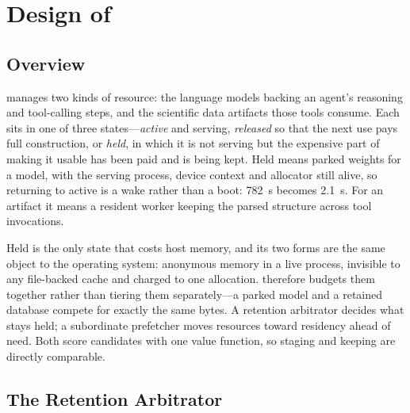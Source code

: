 
\section{Design of \sysname}

\subsection{Overview}

\sysname{} manages two kinds of resource: the language models backing an
agent's reasoning and tool-calling steps, and the scientific data artifacts
those tools consume. Each sits in one of three states---\emph{active} and
serving, \emph{released} so that the next use pays full construction, or
\emph{held}, in which it is not serving but the expensive part of making it
usable has been paid and is being kept. Held means parked weights for a model,
with the serving process, device context and allocator still alive, so
returning to active is a wake rather than a boot: 782~s becomes 2.1~s. For an
artifact it means a resident worker keeping the parsed structure across tool
invocations.

Held is the only state that costs host memory, and its two forms are the same
object to the operating system: anonymous memory in a live process, invisible
to any file-backed cache and charged to one allocation. \sysname{} therefore
budgets them together rather than tiering them separately---a parked model and
a retained database compete for exactly the same bytes. A retention arbitrator
decides what stays held; a subordinate prefetcher moves resources toward
residency ahead of need. Both score candidates with one value function, so
staging and keeping are directly comparable.

\subsection{The Retention Arbitrator}

